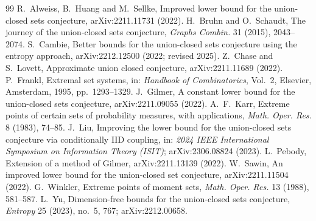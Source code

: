 \documentclass[11pt,a4paper]{article}
\theoremstyle{definition}
\theoremstyle{remark}
\begin{document}
\fussy

\begin{thebibliography}{99}
 R.~Alweiss, B.~Huang and M.~Sellke, Improved lower bound for the union-closed sets conjecture, arXiv:2211.11731 (2022).
 H.~Bruhn and O.~Schaudt, The journey of the union-closed sets conjecture, \emph{Graphs Combin.} 31 (2015), 2043--2074.
 S.~Cambie, Better bounds for the union-closed sets conjecture using the entropy approach, arXiv:2212.12500 (2022; revised 2025).
 Z.~Chase and S.~Lovett, Approximate union closed conjecture, arXiv:2211.11689 (2022).
 P.~Frankl, Extremal set systems, in: \emph{Handbook of Combinatorics}, Vol.~2, Elsevier, Amsterdam, 1995, pp.~1293--1329.
 J.~Gilmer, A constant lower bound for the union-closed sets conjecture, arXiv:2211.09055 (2022).
 A.~F.~Karr, Extreme points of certain sets of probability measures, with applications, \emph{Math. Oper. Res.} 8 (1983), 74--85.
 J.~Liu, Improving the lower bound for the union-closed sets conjecture via conditionally IID coupling, in: \emph{2024 IEEE International Symposium on Information Theory (ISIT)}; arXiv:2306.08824 (2023).
 L.~Pebody, Extension of a method of Gilmer, arXiv:2211.13139 (2022).
 W.~Sawin, An improved lower bound for the union-closed set conjecture, arXiv:2211.11504 (2022).
 G.~Winkler, Extreme points of moment sets, \emph{Math. Oper. Res.} 13 (1988), 581--587.
 L.~Yu, Dimension-free bounds for the union-closed sets conjecture, \emph{Entropy} 25 (2023), no.~5, 767; arXiv:2212.00658.
\end{thebibliography}
\end{document}
